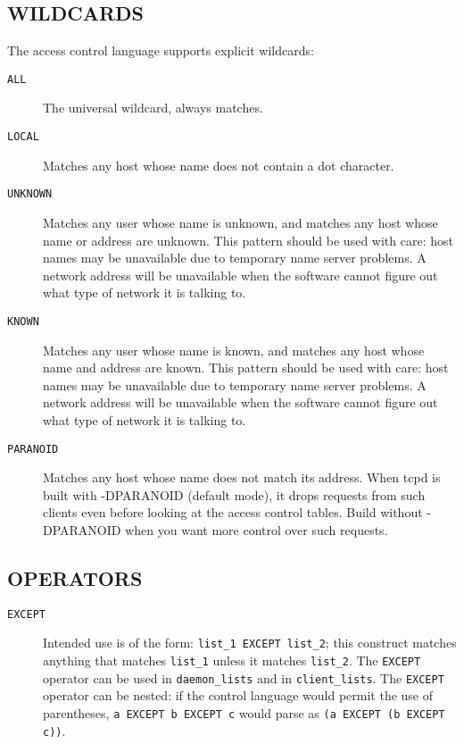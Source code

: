 \documentclass[11pt,twoside,onecolumn]{book}
\begin{document}
\subsection*{WILDCARDS}

The access control language supports explicit wildcards:

\begin{description}
\item[\tt ALL] The universal wildcard, always matches.
\item[\tt LOCAL] Matches any host whose name does not contain a dot character.
\item[\tt UNKNOWN] 
Matches any user whose name is unknown, and matches any host whose name
or address are unknown.  This pattern should be used with care:
host names may be unavailable due to temporary name server problems. A
network address will be unavailable when the software cannot figure out
what type of network it is talking to.
\item[\tt KNOWN]
Matches any user whose name is known, and matches any host whose name
and address are known. This pattern should be used with care:
host names may be unavailable due to temporary name server problems.  A
network address will be unavailable when the software cannot figure out
what type of network it is talking to.
\item[\tt PARANOID]
Matches any host whose name does not match its address.  When tcpd is
built with -DPARANOID (default mode), it drops requests from such
clients even before looking at the access control tables.  Build
without -DPARANOID when you want more control over such requests.

\end{description}

\subsection*{OPERATORS}

\begin{description}

\item[\tt EXCEPT]
Intended use is of the form: {\tt list\_1 EXCEPT list\_2}; this construct
matches anything that matches {\tt list\_1} unless it matches
{\tt list\_2}.  The {\tt EXCEPT} operator can be used in {\tt daemon\_lists} and in
{\tt client\_lists}. The {\tt EXCEPT} operator can be nested: if the control
language would permit the use of parentheses, {\tt a EXCEPT b EXCEPT c}
would parse as {\tt (a EXCEPT (b EXCEPT c))}.

\end{description}
\end{document}

